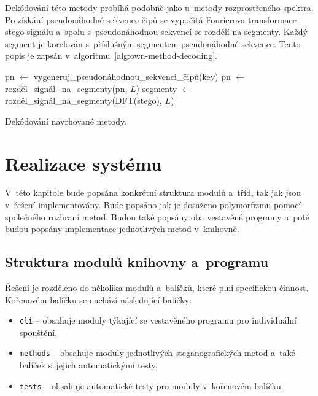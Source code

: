 Dekódování této metody probíhá podobně jako u~metody rozprostřeného spektra. Po
získání pseudonáhodné sekvence čipů se vypočítá Fourierova transformace stego
signálu a~spolu s~pseudonáhodnou sekvencí se rozdělí na segmenty. Každý segment
je korelován s~příslušným segmentem pseudonáhodné sekvence. Tento popis je
zapsán v~algoritmu~\ref{alg:own-method-decoding}.

\begin{algorithm}
    \SetNlSty{}{}{:}
    \LinesNumbered
    \DontPrintSemicolon
    \SetInd{0.4em}{1em}
    \SetNlSkip{0.4em}
    \Indm
    \Indp
    \BlankLine
    \SetInd{1em}{1em}
    pn $\gets$ vygeneruj\_pseudonáhodnou\_sekvenci\_čipů(key)\;
    pn $\gets$ rozděl\_signál\_na\_segmenty(pn, $L$)\;
    segmenty $\gets$ rozděl\_signál\_na\_segmenty(DFT(stego), $L$)\;
    \caption{Dekódování navrhované metody.}
    \label{alg:own-method-decoding}
\end{algorithm}


\chapter{Realizace systému}
\label{cha:implementation}

V~této kapitole bude popsána konkrétní struktura modulů a~tříd, tak jak jsou
v~řešení implementovány. Bude popsáno jak je dosaženo polymorfizmu pomocí
společného rozhraní metod. Budou také popsány oba vestavěné programy a~poté
budou popsány implementace jednotlivých metod v~knihovně.

\section{Struktura modulů knihovny a~programu}
\label{sec:modules}

Řešení je rozděleno do několika modulů a~balíčků, které plní specifickou
činnost. Kořenovém balíčku se nachází následující balíčky:

\begin{itemize}
    \item \texttt{cli} -- obsahuje moduly týkající se vestavěného programu pro
        individuální spouštění,
    \item \texttt{methods} -- obsahuje moduly jednotlivých steganografických
        metod a~také balíček s~jejich automatickými testy,
    \item \texttt{tests} -- obsahuje automatické testy pro moduly v~kořenovém
        balíčku.
\end{itemize}

